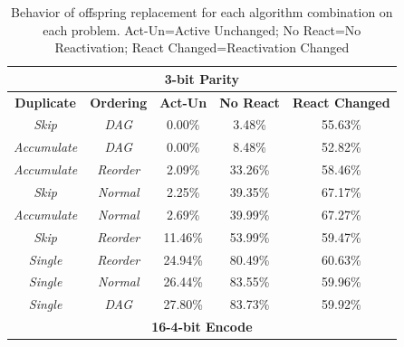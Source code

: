 \documentclass[journal]{IEEEtran}
\begin{document}
\begin{table}
	\centering
	\caption{Behavior of offspring replacement for each algorithm combination
	         on each problem.
	         Act-Un=Active Unchanged; No React=No Reactivation; React Changed=Reactivation Changed}
	\begin{tabular}{|c|c|c|c|c|}
	  \hline
	  \multicolumn{5}{|c|}{\textbf{3-bit Parity}} \\ \hline
\textbf{Duplicate} & \textbf{Ordering} & \textbf{Act-Un} & \textbf{No React} & \textbf{React Changed} \\ \hline
       \emph{Skip} &     \emph{DAG} & 0.00\% & 3.48\% & 55.63\% \\ \hline
 \emph{Accumulate} &     \emph{DAG} & 0.00\% & 8.48\% & 52.82\% \\ \hline
 \emph{Accumulate} & \emph{Reorder} & 2.09\% & 33.26\% & 58.46\% \\ \hline
   \rowcolor{Gray}
       \emph{Skip} &  \emph{Normal} & 2.25\% & 39.35\% & 67.17\% \\ \hline
 \emph{Accumulate} &  \emph{Normal} & 2.69\% & 39.99\% & 67.27\% \\ \hline
       \emph{Skip} & \emph{Reorder} & 11.46\% & 53.99\% & 59.47\% \\ \hline
     \emph{Single} & \emph{Reorder} & 24.94\% & 80.49\% & 60.63\% \\ \hline
     \emph{Single} &  \emph{Normal} & 26.44\% & 83.55\% & 59.96\% \\ \hline
     \emph{Single} &     \emph{DAG} & 27.80\% & 83.73\% & 59.92\% \\ \hline\hline

  \multicolumn{5}{|c|}{\textbf{16-4-bit Encode}} \\ \hline


\end{tabular}
\end{table}
\end{document}

